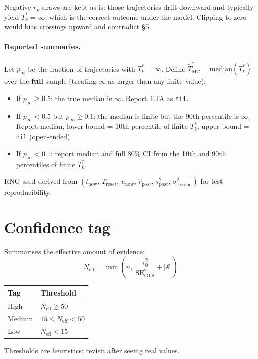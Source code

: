 \documentclass[11pt]{article}
\newcommand{\rpost}{\hat r_{\text{post}}}
\newcommand{\taupostsq}{\tau_{\text{post}}^2}
\newcommand{\tauzerosq}{\tau_0^2}
\newcommand{\seolssq}{\mathrm{SE}_{\text{OLS}}^2}
\newcommand{\sigsessionsq}{\sigma_{\text{session}}^2}
\newcommand{\unow}{u_{\text{now}}}
\newcommand{\tnow}{t_{\text{now}}}
\newcommand{\Treset}{T_{\text{reset}}}
\newcommand{\Tstar}{T^\ast}
\newcommand{\Tstark}{T^\ast_k}
\begin{document}
Negative $r_k$ draws are kept as-is: those trajectories drift downward and
typically yield $\Tstark = \infty$, which is the correct outcome under the
model. Clipping to zero would bias crossings upward and contradict \S5.

\paragraph{Reported summaries.} Let $p_\infty$ be the fraction of
trajectories with $\Tstark = \infty$. Define $\tilde\Tstar_{\text{MC}} =
\mathrm{median}(\Tstark)$ over the \textbf{full} sample (treating $\infty$
as larger than any finite value):

\begin{itemize}
  \item If $p_\infty \geq 0.5$: the true median is $\infty$. Report ETA as
    \texttt{nil}.
  \item If $p_\infty < 0.5$ but $p_\infty \geq 0.1$: the median is finite
    but the 90th percentile is $\infty$. Report median, lower bound = 10th
    percentile of finite $\Tstark$, upper bound = \texttt{nil}
    (open-ended).
  \item If $p_\infty < 0.1$: report median and full 80\% CI from the 10th
    and 90th percentiles of finite $\Tstark$.
\end{itemize}

RNG seed derived from $(\tnow,\, \Treset,\, \unow,\, \rpost,\, \taupostsq,\,
\sigsessionsq)$ for test reproducibility.

\section{Confidence tag}

Summarises the effective amount of evidence:
\[
  N_{\text{eff}} = \min\!\left(n,\
    \frac{\tauzerosq}{\seolssq} + \lvert\mathcal{S}\rvert\right).
\]

\begin{center}
\begin{tabular}{@{}ll@{}}
\toprule
Tag & Threshold \\
\midrule
High   & $N_{\text{eff}} \geq 50$ \\
Medium & $15 \leq N_{\text{eff}} < 50$ \\
Low    & $N_{\text{eff}} < 15$ \\
\bottomrule
\end{tabular}
\end{center}

Thresholds are heuristics; revisit after seeing real values.
\end{document}
